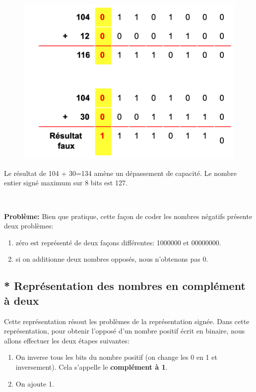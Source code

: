 \documentclass[11pt, a4paper]{book}
\begin{document}
\begin{figure}[h]
\begin{center}
\includegraphics[scale=.5]{images/Operationsigne}
\end{center}
\end{figure}

Le résultat de 104 + 30=134 amène un dépassement de capacité. Le nombre entier signé maximum sur 8 bits est 127.


\ 

{\bf Problème:} Bien que pratique, cette façon de coder les nombres négatifs présente deux problèmes:
\begin{enumerate}
\item zéro est représenté de deux façons différentes: 1000000 et 00000000.
\item si on additionne deux nombres opposés, nous n'obtenons pas 0. 
\end{enumerate}

\subsection{* Représentation des nombres en complément à deux}

Cette représentation résout les problèmes de la représentation signée. Dans cette représentation, pour obtenir l'opposé d'un nombre positif écrit en binaire, nous allons effectuer les deux étapes suivantes:
\begin{enumerate}
 \item On inverse tous les bits du nombre positif (on change les 0 en 1 et inversement). Cela s'appelle le {\bf complément à 1}.
 \item On ajoute 1.
\end{enumerate}
\end{document}
